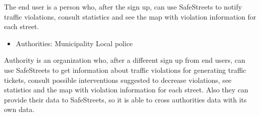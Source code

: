 The end user is a person who, after the sign up, can use SafeStreets to notify traffic violations, consult statistics and see the map with violation information for each street.

\begin{itemize}
	\item Authorities:
	\subitem Municipality
	\subitem Local police
\end{itemize}


Authority is an organization who, after a different sign up from end users, can use SafeStreets to get information about traffic violations for generating traffic tickets, consult possible interventions suggested to decrease violations, see statistics and the map with violation information for each street.
Also they can provide their data to SafeStreets, so it is able to cross authorities data with its own data.






